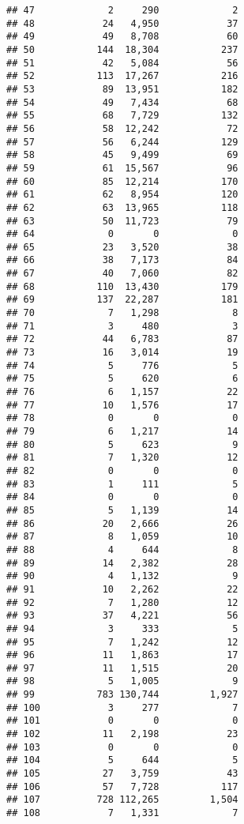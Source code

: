 \documentclass[
]{article}
\begin{document}
\begin{verbatim}
## 47             2     290             2
## 48            24   4,950            37
## 49            49   8,708            60
## 50           144  18,304           237
## 51            42   5,084            56
## 52           113  17,267           216
## 53            89  13,951           182
## 54            49   7,434            68
## 55            68   7,729           132
## 56            58  12,242            72
## 57            56   6,244           129
## 58            45   9,499            69
## 59            61  15,567            96
## 60            85  12,214           170
## 61            62   8,954           120
## 62            63  13,965           118
## 63            50  11,723            79
## 64             0       0             0
## 65            23   3,520            38
## 66            38   7,173            84
## 67            40   7,060            82
## 68           110  13,430           179
## 69           137  22,287           181
## 70             7   1,298             8
## 71             3     480             3
## 72            44   6,783            87
## 73            16   3,014            19
## 74             5     776             5
## 75             5     620             6
## 76             6   1,157            22
## 77            10   1,576            17
## 78             0       0             0
## 79             6   1,217            14
## 80             5     623             9
## 81             7   1,320            12
## 82             0       0             0
## 83             1     111             5
## 84             0       0             0
## 85             5   1,139            14
## 86            20   2,666            26
## 87             8   1,059            10
## 88             4     644             8
## 89            14   2,382            28
## 90             4   1,132             9
## 91            10   2,262            22
## 92             7   1,280            12
## 93            37   4,221            56
## 94             3     333             5
## 95             7   1,242            12
## 96            11   1,863            17
## 97            11   1,515            20
## 98             5   1,005             9
## 99           783 130,744         1,927
## 100            3     277             7
## 101            0       0             0
## 102           11   2,198            23
## 103            0       0             0
## 104            5     644             5
## 105           27   3,759            43
## 106           57   7,728           117
## 107          728 112,265         1,504
## 108            7   1,331             7

\end{verbatim}
\end{document}
